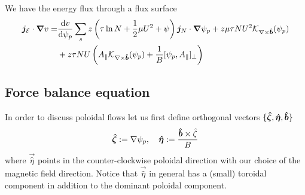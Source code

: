 We have the energy flux through a flux surface
\begin{align}
 \vec j_{\mathcal E}\cdot \vec \nabla v =&%
\frac{\d v}{\d \psi_p}\sum_s z\left (\tau\ln N + \frac{1}{2}\mu U^2 + \psi\right) \vec j_N\cdot\vec\nabla\psi_p
+ z \mu\tau NU^2 \mathcal K_{\nabla\times\bhat}(\psi_p) \nonumber\\
&+ z \tau NU
 \left( A_\parallel \mathcal
 K_{\nabla\times\bhat}(\psi_p) + \frac{1}{B}[\psi_p, A_\parallel]_\perp\right)
\label{eq:energy_flux}
\end{align}

\subsection{ Force balance equation}
In order to discuss poloidal flows let us first define orthogonal vectors $\{{\boldsymbol{ \hat\zeta}}, {\boldsymbol{\hat\eta}},\bm{\hat{b}}\}$
\begin{align}
{\boldsymbol{\hat\zeta}} := \nabla\psi_p,\quad
{\boldsymbol{\hat \eta}} := \frac{\bm{\hat{b}} \times\hat \zeta}{B}
\end{align}
where $\vec{\hat\eta}$
points in the counter-clockwise poloidal direction with our choice of the magnetic field direction.
Notice that $\vec{\hat \eta}$ in general has a (small) toroidal component in addition to the dominant poloidal component.

